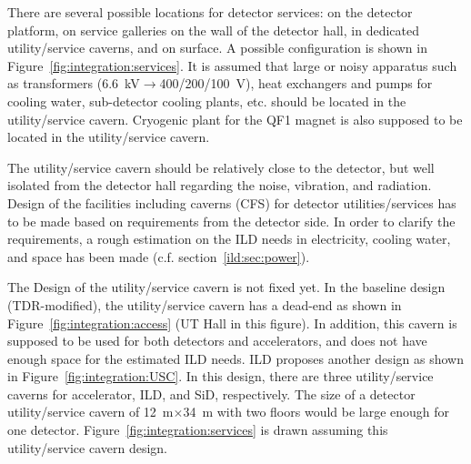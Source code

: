 There are several possible locations for detector services: on the detector platform, on service galleries on the wall of the detector hall, in dedicated utility/service caverns, and on surface. A possible configuration is shown in Figure~\ref{fig:integration:services}.
It is assumed that large or noisy apparatus such as transformers (6.6~kV$\rightarrow$400/200/100~V), heat exchangers and pumps for cooling water, sub-detector cooling plants, etc. should be located in the utility/service cavern. Cryogenic plant for the QF1 magnet is also supposed to be located in the utility/service cavern.

The utility/service cavern should be relatively close to the detector, but well isolated from the detector hall  regarding the noise, vibration, and radiation. Design of the facilities including caverns (CFS) for detector utilities/services has to be made based on requirements from the detector side. In order to clarify the requirements, a rough estimation on the ILD needs in electricity, cooling water, and space has been made (c.f. section~\ref{ild:sec:power}). 

The Design of the utility/service cavern is not fixed yet. In the baseline design (TDR-modified), the utility/service cavern has a dead-end as shown in Figure~\ref{fig:integration:access} (UT Hall in this figure). In addition, this cavern is supposed to be used for both detectors and accelerators, and does not have enough space for the estimated ILD needs. 
ILD proposes another design as shown in Figure~\ref{fig:integration:USC}. In this design, there are three utility/service caverns for accelerator, ILD, and SiD, respectively. The size of a detector utility/service cavern of 12~m$\times$34~m with two floors would be large enough for one detector.   Figure~\ref{fig:integration:services} is drawn assuming this utility/service cavern design.


